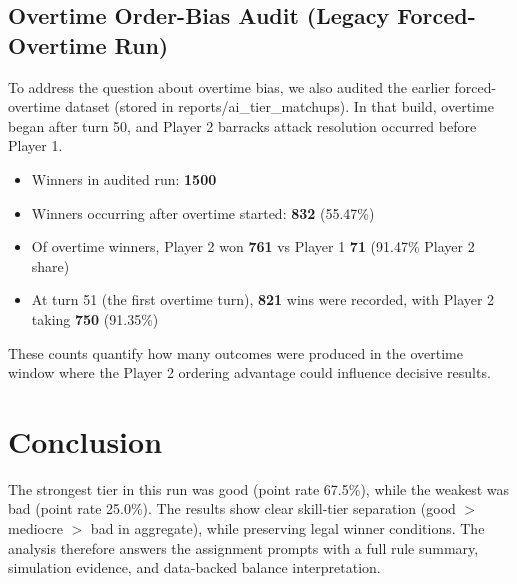 \documentclass[12pt]{article}
\begin{document}
\subsection{Overtime Order-Bias Audit (Legacy Forced-Overtime Run)}
To address the question about overtime bias, we also audited the earlier forced-overtime dataset (stored in reports/ai\_tier\_matchups). In that build, overtime began after turn 50, and Player 2 barracks attack resolution occurred before Player 1.
\begin{itemize}
\item Winners in audited run: \textbf{1500}
\item Winners occurring after overtime started: \textbf{832} (55.47\%)
\item Of overtime winners, Player 2 won \textbf{761} vs Player 1 \textbf{71} (91.47\% Player 2 share)
\item At turn 51 (the first overtime turn), \textbf{821} wins were recorded, with Player 2 taking \textbf{750} (91.35\%)
\end{itemize}
These counts quantify how many outcomes were produced in the overtime window where the Player 2 ordering advantage could influence decisive results.
\section{Conclusion}
The strongest tier in this run was good (point rate 67.5\%), while the weakest was bad (point rate 25.0\%). The results show clear skill-tier separation (good $>$ mediocre $>$ bad in aggregate), while preserving legal winner conditions. The analysis therefore answers the assignment prompts with a full rule summary, simulation evidence, and data-backed balance interpretation.
\end{document}
